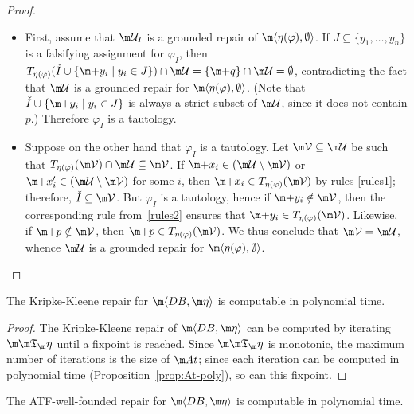 \begin{proof}
  \begin{itemize}
  \item First, assume that $\UU_I$ is a grounded repair of $\dbhere$.
    If $J\subseteq\{y_1,\ldots,y_n\}$ is a falsifying assignment for $\varphi_I$, then $T_{\eta(\varphi)}(\check I\cup\{\add y_i\mid y_i\in J\})\cap\UU=\{\add q\}\cap\UU=\emptyset$, contradicting the fact that $\UU$ is a grounded repair for $\dbhere$.
    (Note that $\check I\cup\{\add y_i\mid y_i\in J\}$ is always a strict subset of $\UU$, since it does not contain $p$.)
    Therefore $\varphi_I$ is a tautology.
  \item Suppose on the other hand that $\varphi_I$ is a tautology.
    Let $\VV\subseteq\UU$ be such that $T_{\eta(\varphi)}(\VV)\cap\UU\subseteq\VV$.
    If $\add x_i\in(\UU\setminus\VV)$ or  $\add x_i'\in(\UU\setminus\VV)$ for some $i$, then $\add x_i\in T_{\eta(\varphi)}(\VV)$ by rules \ref{rules1}; therefore, $\check I\subseteq\VV$.
    But $\varphi_I$ is a tautology, hence if $\add y_i\notin\VV$, then the corresponding rule from~\ref{rules2} ensures that $\add y_i\in T_{\eta(\varphi)}(\VV)$. Likewise, if $\add p\notin\VV$, then $\add p\in T_{\eta(\varphi)}(\VV)$.
    We thus conclude that $\VV=\UU$, whence $\UU$ is a grounded repair for $\dbhere$.\qedhere
  \end{itemize}
\end{proof}

\begin{proposition}
  The Kripke-Kleene repair for $\fulldb$ is computable in polynomial time.
  \label{prop:KK-poly}
\end{proposition}
\begin{proof}
  The Kripke-Kleene repair of $\fulldb$ can be computed by iterating $\Ap$ until a fixpoint is reached.
  Since $\Ap$ is monotonic, the maximum number of iterations is the size of $\atoms$; since each iteration can be computed in polynomial time (Proposition~\ref{prop:At-poly}), so can this fixpoint.
\end{proof}

\begin{proposition}\label{prop:compl:wf}
  The ATF-well-founded repair for $\fulldb$ is computable in polynomial time.
\end{proposition}

